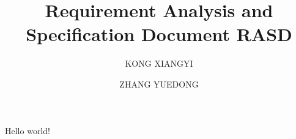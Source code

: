\documentclass{article}
\title{Requirement Analysis and Specification Document RASD}
\author{
	KONG XIANGYI
	\and
	ZHANG YUEDONG
	}
\begin{document}
 
	
\maketitle

	Hello world! 
\end{document}
